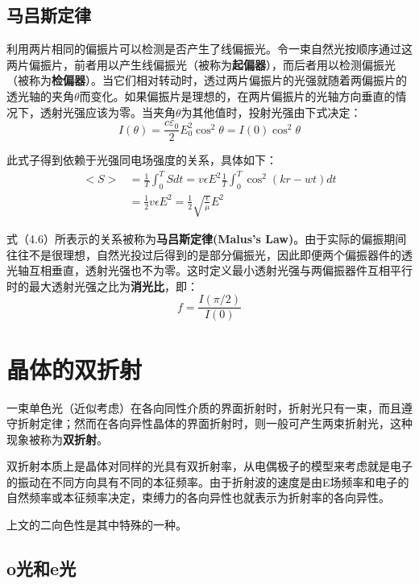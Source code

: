 \documentclass[UTF8]{ctexart}
\newcommand{\backdoc}{\normalsize}
\begin{document}
	\subsection{马吕斯定律}
	
	\backdoc
	利用两片相同的偏振片可以检测是否产生了线偏振光。令一束自然光按顺序通过这两片偏振片，前者用以产生线偏振光（被称为\textbf{起偏器}），而后者用以检测偏振光（被称为\textbf{检偏器}）。当它们相对转动时，透过两片偏振片的光强就随着两偏振片的透光轴的夹角$\theta$而变化。如果偏振片是理想的，在两片偏振片的光轴方向垂直的情况下，透射光强应该为零。当夹角$\theta$为其他值时，投射光强由下式决定：
	\begin{equation}
	I(\theta)=\frac{c \varepsilon_{0}}{2} E_{0}^{2} \cos ^{2} \theta=I(0) \cos ^{2} \theta
	\end{equation}
	
	此式子得到依赖于光强同电场强度的关系，具体如下：
	\begin{equation}
		\begin{aligned}
	<S>&=\frac{1}{T} \int_{0}^{T} S d t=v \epsilon E^{2} \frac{1}{T} \int_{0}^{T} \cos ^{2}(k r-w t) d t\\
	&=\frac{1}{2} v \epsilon E^{2}=\frac{1}{2} \sqrt{\frac{\epsilon}{\mu}}  E^{2}
		\end{aligned}
	\end{equation}
	
	式（4.6）所表示的关系被称为\textbf{马吕斯定律(Malus's Law)}。由于实际的偏振期间往往不是很理想，自然光投过后得到的是部分偏振光，因此即便两个偏振器件的透光轴互相垂直，透射光强也不为零。这时定义最小透射光强与两偏振器件互相平行时的最大透射光强之比为\textbf{消光比}，即：
	\begin{equation}
	f=\frac{I(\pi/2)}{I(0)}
	\end{equation}
	
	\section{晶体的双折射}
	一束单色光（近似考虑）在各向同性介质的界面折射时，折射光只有一束，而且遵守折射定律；然而在各向异性晶体的界面折射时，则一般可产生两束折射光，这种现象被称为\textbf{双折射}。
	
	双折射本质上是晶体对同样的光具有双折射率，从电偶极子的模型来考虑就是电子的振动在不同方向具有不同的本征频率。由于折射波的速度是由E场频率和电子的自然频率或本征频率决定，束缚力的各向异性也就表示为折射率的各向异性。
	
	上文的二向色性是其中特殊的一种。
	
	\subsection{o光和e光}
	
\end{document}
